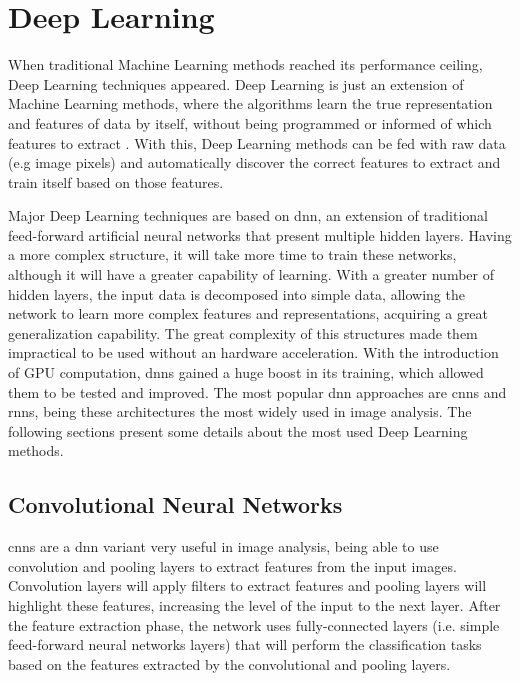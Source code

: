 \documentclass[
  twoside,
  11pt, a4paper,
  footinclude=true,
  headinclude=true,
  cleardoublepage=empty
]{scrbook}
\begin{document}
    \section{Deep Learning} \label{background:deep-learning}
      When traditional Machine Learning methods reached its performance ceiling, Deep Learning techniques appeared. Deep Learning is just an extension of Machine Learning methods, where the algorithms learn the true representation and features of data by itself, without being programmed or informed of which features to extract \cite{lecun2015deep}. With this, Deep Learning methods can be fed with raw data (e.g image pixels) and automatically discover the correct features to extract and train itself based on those features.

      Major Deep Learning techniques are based on \gls{dnn}, an extension of traditional feed-forward artificial neural networks that present multiple hidden layers. Having a more complex structure, it will take more time to train these networks, although it will have a greater capability of learning. With a greater number of hidden layers, the input data is decomposed into simple data, allowing the network to learn more complex features and representations, acquiring a great generalization capability. The great complexity of this structures made them impractical to be used without an hardware acceleration. With the introduction of GPU computation, \glspl{dnn} gained a huge boost in its training, which allowed them to be tested and improved. The most popular \gls{dnn} approaches are \glspl{cnn} and \glspl{rnn}, being these architectures the most widely used in image analysis. The following sections present some details about the most used Deep Learning methods.

      \subsection{Convolutional Neural Networks} \label{background:deep-learning:cnn}
        \glspl{cnn} are a \gls{dnn} variant very useful in image analysis, being able to use convolution and pooling layers to extract features from the input images. Convolution layers will apply filters to extract features and pooling layers will highlight these features, increasing the level of the input to the next layer. After the feature extraction phase, the network uses fully-connected layers (i.e. simple feed-forward neural networks layers) that will perform the classification tasks based on the features extracted by the convolutional and pooling layers. %
\end{document}

